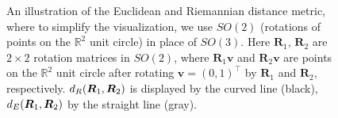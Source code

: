 
\begin{figure}[h!]
\begin{center}
\end{center}
\vspace{-.25cm}
\caption{An illustration of the Euclidean and Riemannian distance metric, where to simplify the visualization, we use $SO(2)$ (rotations of points on the $\mathbb R^2$ unit circle) in place of $SO(3)$.  Here $\bm R_1$, $\bm R_2$ are $2\times2$ rotation matrices in $SO(2)$, where $\bm R_1\bm v$ and $\bm R_2\bm v$ are points on the $\mathbb R^2$ unit circle  after rotating $\bm v = (0,1)^{\top}$ by  $\bm R_1$ and $\bm R_2$, respectively.  ${d_R} (\bm R_1,\bm R_2)$ is displayed by the curved line (black), ${d_E} (\bm R_1,\bm R_2)$ by the straight line (gray).}
\label{fig:dEvsdG} 
\end{figure}

